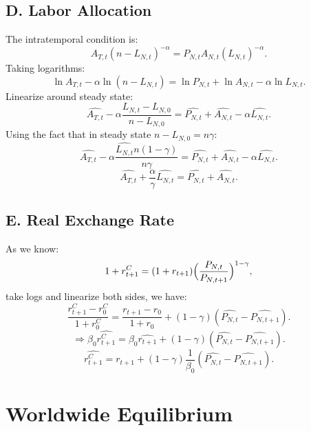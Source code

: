 \documentclass[a4paper,12pt]{article} %
\theoremstyle{nonitalic}
\begin{document}
\subsection*{D. Labor Allocation}
The intratemporal condition is:
\[
A_{T,t}(n-L_{N,t})^{-\alpha} = P_{N,t} A_{N,t}(L_{N,t})^{-\alpha}.
\]
Taking logarithms:
\[
\ln A_{T,t} - \alpha \ln (n-L_{N,t}) = \ln P_{N,t} + \ln A_{N,t} - \alpha \ln L_{N,t}.
\]
Linearize around steady state:
\[
\widehat{A_{T,t}} - \alpha \frac{L_{N,t} - L_{N,0}}{n-L_{N,0}} =  \widehat{P_{N,t}} +  \widehat{A_{N,t}} - \alpha  \widehat{L_{N,t}}.
\]
Using the fact that in steady state $n-L_{N,0}=n\gamma$:
\[
\widehat{A_{T,t}} - \alpha \frac{ \widehat{L_{N,t}} n(1-\gamma)}{n \gamma} =  \widehat{P_{N,t}} +  \widehat{A_{N,t}} - \alpha  \widehat{L_{N,t}}.
\]
\[
\boxed{\widehat{A_{T,t}} + \frac{\alpha}{\gamma}  \widehat{L_{N,t}} =  \widehat{P_{N,t}} +  \widehat{A_{N,t}}. \tag{7g}}
\]

\subsection*{E. Real Exchange Rate}
As we know:
\[
1+r_{t+1}^{C} = (1+r_{t+1}) \Bigl(\frac{P_{N,t}}{P_{N,t+1}}\Bigr)^{1-\gamma},
\]
take logs and linearize both sides, we have:
\[
\frac{r_{t+1}^C - r_0^C }{1+r_0^C} = \frac{r_{t+1} - r_0}{1+r_0} + (1-\gamma)( \widehat{P_{N,t}} -  \widehat{P_{N,t+1}}).
\]
\[
\Rightarrow \beta_0  \widehat{r_{t+1}^C} = \beta_0  \widehat{r_{t+1}} + (1-\gamma)( \widehat{P_{N,t}} -  \widehat{P_{N,t+1}}).
\]
\[
\boxed{ \widehat{r_{t+1}^C} =  \widehat{r_{t+1}} + (1-\gamma) \frac{1}{\beta_0} ( \widehat{P_{N,t}} -  \widehat{P_{N,t+1}}). \tag{7i}}
\]


\section{Worldwide Equilibrium}
\end{document}
